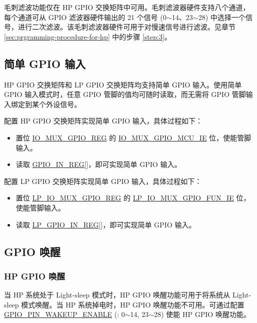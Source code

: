 \documentclass[main\_\_CN.tex]{subfiles}
\begin{document}
毛刺滤波功能仅在 HP GPIO 交换矩阵中可用。毛刺滤波器硬件支持八个通道，每个通道可从 GPIO 滤波器硬件输出的 21 个信号 (0$\sim$14、23$\sim$28) 中选择一个信号，进行二次滤波。该毛刺滤波器硬件可用于对慢速信号进行滤波。见章节 \ref{sec:prgramming-procedure-for-hp} 中的步骤 \ref{step:3}。

\subsection{简单 GPIO 输入}
\label{IOMUXSimpleGPIOInput}
HP GPIO 交换矩阵和 LP GPIO 交换矩阵均支持简单 GPIO 输入。使用简单 GPIO 输入模式时，任意 GPIO 管脚的值均可随时读取，而无需将 GPIO 管脚输入绑定到某个外设信号。

配置 HP GPIO 交换矩阵实现简单 GPIO 输入，具体过程如下：
\begin{itemize}
    \item 置位 \hyperref[regdesc:IOMUXGPIONREG]{IO\_MUX\_GPIO\_REG} 的 \hyperref[fielddesc:IOMUXGPIONMCUIE] {IO\_MUX\_GPIO\_MCU\_IE} 位，使能管脚输入。
    \item 读取 \hyperref[regdesc:GPIOINREG]{GPIO\_IN\_REG[]}，即可实现简单 GPIO 输入。
\end{itemize}

配置 LP GPIO 交换矩阵实现简单 GPIO 输入，具体过程如下：
\begin{itemize}
    \item 置位 \hyperref[regdesc:LPIOMUXGPIONREG]{LP\_IO\_MUX\_GPIO\_REG} 的 \hyperref[fielddesc:LPIOMUXGPIONFUNIE] {LP\_IO\_MUX\_GPIO\_FUN\_IE} 位，使能管脚输入。
    \item 读取 \hyperref[regdesc:LPGPIOINREG]{LP\_GPIO\_IN\_REG[]}，即可实现简单 GPIO 输入。
\end{itemize}


\subsection{GPIO 唤醒}
\label{IOMUXGPIOWakeup}
\subsubsection{HP GPIO 唤醒}
    当 HP 系统处于 Light-sleep 模式时，HP GPIO 唤醒功能可用于将系统从 Light-sleep 模式唤醒。当 HP 系统掉电时，HP GPIO 唤醒功能不可用。可通过配置 \hyperref[fielddesc:GPIOPINNWAKEUPENABLE] {GPIO\_PIN\_WAKEUP\_ENABLE} (: 0$\sim$14, 23$\sim$28) 使能 HP GPIO 唤醒功能。
\end{document}
